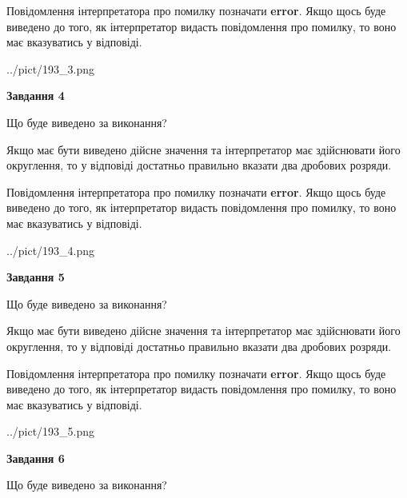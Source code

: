\documentclass[12pt, ukrainian]{article}
\begin{document}
{\begin {Large}
Повідомлення інтерпретатора про помилку позначати \textbf{error}.
Якщо щось буде виведено до того, як інтерпретатор видасть повідомлення про помилку, 
то воно має вказуватись у відповіді. \par

\begin{center}
	{../pict/193_3.png}
\end{center}
\newpage

{\begin {center}\textbf{Завдання 4}\end {center}}\par
Що буде виведено за виконання? \par

Якщо має бути виведено дійсне значення та інтерпретатор має здійснювати його округлення, 
то у відповіді достатньо правильно вказати два дробових розряди.

Повідомлення інтерпретатора про помилку позначати \textbf{error}.
Якщо щось буде виведено до того, як інтерпретатор видасть повідомлення про помилку, 
то воно має вказуватись у відповіді. \par

\begin{center}
	{../pict/193_4.png}
\end{center}
\newpage

{\begin {center}\textbf{Завдання 5}\end {center}}\par
Що буде виведено за виконання? \par

Якщо має бути виведено дійсне значення та інтерпретатор має здійснювати його округлення, 
то у відповіді достатньо правильно вказати два дробових розряди.

Повідомлення інтерпретатора про помилку позначати \textbf{error}.
Якщо щось буде виведено до того, як інтерпретатор видасть повідомлення про помилку, 
то воно має вказуватись у відповіді. \par

\begin{center}
	{../pict/193_5.png}
\end{center}
\newpage

{\begin {center}\textbf{Завдання 6}\end {center}}\par
Що буде виведено за виконання? \par


\end{Large}}
\end{document}
